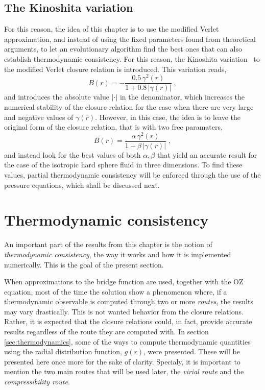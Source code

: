 \subsection{The Kinoshita variation}
For this reason, the idea of this chapter is to use the modified Verlet approximation, and instead of using the fixed parameters found from theoretical arguments, to let an evolutionary algorithm find the best ones that can also establish thermodynamic consistency. For this reason, the Kinoshita variation~\cite{kinoshitaInteractionSurfacesSolvophobicity2003} to the modified Verlet closure relation is introduced. This variation reads,
\begin{equation}
    B(r) = - \frac{0.5 \, \gamma^{2}(r)}{1 + 0.8 \, \left\lvert \gamma(r) \right\rvert}
    \; ,
    \label{eq:kinoshita-eq}
\end{equation}
and introduces the absolute value \(\left\lvert \cdot \right\rvert\) in the denominator, 
which increases the numerical stability of the closure relation for the case when there are 
very large and negative values of \(\gamma(r)\). However, in this case, the idea is to leave the original form of the closure relation, that is with two free paramaters,
\begin{equation}
    B(r) = \frac{\alpha \, \gamma^{2}(r)}{1 + \beta \, \left\lvert \gamma(r) \right\rvert}
    \; ,
    \label{eq:kinoshita-params}
\end{equation}
and instead look for the best values of both \(\alpha, \beta\) that yield an accurate 
result for the case of the isotropic hard sphere fluid in three dimensions.
To find these values, partial thermodynamic consistency will be enforced through the use of 
the pressure equations, which shall be discussed next.

\section{Thermodynamic consistency}
An important part of the results from this chapter is the notion of 
\emph{thermodynamic consistency}, the way it works and how it is implemented numerically. 
This is the goal of the present section.

When approximations to the bridge function are used, together with the OZ equation, most of 
the time the solution show a phenomenon where, if a thermodynamic observable is computed 
through two or more \emph{routes}, the results may vary drastically. This is not wanted 
behavior from the closure relations. Rather, it is expected that the closure relations 
could, in fact, provide accurate results regardless of the route they are computed with.
In section \autoref{sec:thermodynamics}, some of the ways to compute thermodynamic 
quantities using the radial distribution function, \(g(r)\), were presented. These will be 
presented here once more for the sake of clarity. Specialy, it is important to mention the 
two main routes that will be used later, the \emph{virial route} and the 
\emph{compressibility route}.

